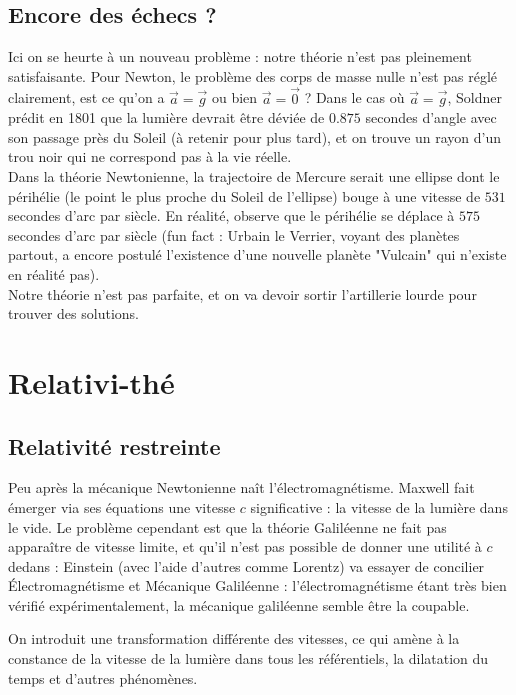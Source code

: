 \documentclass{classe}
\begin{document}
\subsection{Encore des échecs ?}

Ici on se heurte à un nouveau problème : notre théorie n'est pas pleinement satisfaisante. Pour Newton, le problème des corps de masse nulle n'est pas réglé clairement, est ce qu'on a $\vec{a} = \vec{g}$ ou bien $\vec{a} = \vec{0}$ ? Dans le cas où $\vec{a} = \vec{g}$, Soldner prédit en 1801 que la lumière devrait être déviée de $0.875$ secondes d'angle avec son passage près du Soleil (à retenir pour plus tard), et on trouve un rayon d'un trou noir qui ne correspond pas à la vie réelle.\\

Dans la théorie Newtonienne, la trajectoire de Mercure serait une ellipse dont le périhélie (le point le plus proche du Soleil de l'ellipse) bouge à une vitesse de $531$ secondes d'arc par siècle. En réalité, observe que le périhélie se déplace à $575$ secondes d'arc par siècle (fun fact : Urbain le Verrier, voyant des planètes partout, a encore postulé l'existence d'une nouvelle planète "Vulcain" qui n'existe en réalité pas).\\

Notre théorie n'est pas parfaite, et on va devoir sortir l'artillerie lourde pour trouver des solutions.

\section{Relativi-thé}

\subsection{Relativité restreinte}

Peu après la mécanique Newtonienne naît l'électromagnétisme. Maxwell fait émerger via ses équations une vitesse $c$ significative : la vitesse de la lumière dans le vide. Le problème cependant est que la théorie Galiléenne ne fait pas apparaître de vitesse limite, et qu'il n'est pas possible de donner une utilité à $c$ dedans : Einstein (avec l'aide d'autres comme Lorentz) va essayer de concilier Électromagnétisme et Mécanique Galiléenne : l'électromagnétisme étant très bien vérifié expérimentalement, la mécanique galiléenne semble être la coupable.

On introduit une transformation différente des vitesses, ce qui amène à la constance de la vitesse de la lumière dans tous les référentiels, la dilatation du temps et d'autres phénomènes.
\end{document}
